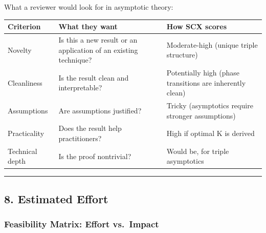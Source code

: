 \documentclass[
  12pt,
]{ctexart}
\begin{document}
What a reviewer would look for in asymptotic theory:

\begin{longtable}[]{@{}
  >{\raggedright\arraybackslash}p{}
  >{\raggedright\arraybackslash}p{}
  >{\raggedright\arraybackslash}p{}@{}}
\toprule\noalign{}
\begin{minipage}[b]{\linewidth}\raggedright
Criterion
\end{minipage} & \begin{minipage}[b]{\linewidth}\raggedright
What they want
\end{minipage} & \begin{minipage}[b]{\linewidth}\raggedright
How SCX scores
\end{minipage} \\
\midrule\noalign{}
\endhead
\bottomrule\noalign{}
\endlastfoot
Novelty & Is this a new result or an application of an existing
technique? & Moderate-high (unique triple structure) \\
Cleanliness & Is the result clean and interpretable? & Potentially high
(phase transitions are inherently clean) \\
Assumptions & Are assumptions justified? & Tricky (asymptotics require
stronger assumptions) \\
Practicality & Does the result help practitioners? & High if optimal K
is derived \\
Technical depth & Is the proof nontrivial? & Would be, for triple
asymptotics \\
\end{longtable}

\begin{center}\rule{0.5\linewidth}{0.5pt}\end{center}

\subsection{8. Estimated Effort}\label{estimated-effort}

\subsubsection{Feasibility Matrix: Effort
vs.~Impact}\label{feasibility-matrix-effort-vs.-impact}
\end{document}

